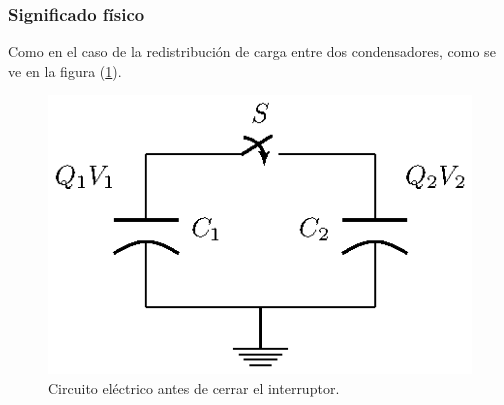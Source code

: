 \documentclass[12pt]{beamer}
\begin{document}
\begin{frame}
\frametitle{Significado físico}
Como en el caso de la redistribución de carga entre dos condensadores, como se ve en la figura (\ref{fig_figura_delta_Dirac_03}).
\begin{figure}[H]
    \centering
    \includegraphics[scale=1.4]{Imagenes/delta_Dirac_03.eps}
    \caption{Circuito eléctrico antes de cerrar el interruptor.}
    \label{fig_figura_delta_Dirac_03}
\end{figure}
\end{frame}
\end{document}
